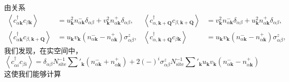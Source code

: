由关系
\begin{align*}
\left\langle c^{\dagger}_{\alpha\pmb{k}}c_{\beta\pmb{k}}\right\rangle&=u^{2}_{\pmb{k}}n^{-}_{\alpha\pmb{k}}\delta_{\alpha\beta}+v^{2}_{\pmb{k}}n^{+}_{\alpha\pmb{k}}\delta_{\alpha\beta}, & \left\langle c^{\dagger}_{\alpha,\pmb{k}+\pmb{Q}}c_{\beta,\pmb{k}+\pmb{Q}}\right\rangle&=v^{2}_{\pmb{k}}n^{-}_{\alpha\pmb{k}}\delta_{\alpha\beta}+u^{2}_{\pmb{k}}n^{+}_{\alpha\pmb{k}}\delta_{\alpha\beta},\\
\left\langle c^{\dagger}_{\alpha\pmb{k}}c_{\beta,\pmb{k}+\pmb{Q}}\right\rangle&=u_{\pmb{k}}v_{\pmb{k}}(n^{-}_{\alpha\pmb{k}}-n^{+}_{\alpha\pmb{k}})\sigma^{z}_{\alpha\beta}, & \left\langle c^{\dagger}_{\alpha,\pmb{k}+\pmb{Q}}c_{\beta\pmb{k}}\right\rangle&=u_{\pmb{k}}v_{\pmb{k}}(n^{-}_{\alpha\pmb{k}}-n^{+}_{\alpha\pmb{k}})\sigma^{z}_{\alpha\beta},
\end{align*}
我们发现，在实空间中，
\begin{equation*}
\left\langle c^{\dagger}_{\alpha i}c_{\beta i}\right\rangle=\delta_{\alpha\beta}N^{-1}_{\mathrm{site}}\sum'_{\pmb{k}}(n^{-}_{\alpha\pmb{k}}+n^{+}_{\alpha\pmb{k}})+2(-)^{i}\sigma^{z}_{\alpha\beta}N^{-1}_{\mathrm{site}}\sum'_{\pmb{k}}u_{\pmb{k}}v_{\pmb{k}}(n^{-}_{\alpha\pmb{k}}-n^{+}_{\alpha\pmb{k}})
\end{equation*}
这使我们能够计算
